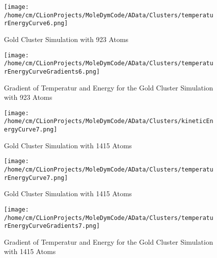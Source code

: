 \begin{figure}[!h] 
    \begin{center} 
        \texttt{[image: /home/cm/CLionProjects/MoleDymCode/AData/Clusters/temperaturEnergyCurve6.png]} 
    \end{center} 
    \caption[Gold Cluster Simulation with 923 Atoms]{Gold Cluster Simulation with 923 Atoms} 
    \label{GoldClusterSimulationTemperaturEnergy923} 
\end{figure} 
 
\begin{figure}[!h] 
    \begin{center} 
        \texttt{[image: /home/cm/CLionProjects/MoleDymCode/AData/Clusters/temperaturEnergyCurveGradients6.png]} 
    \end{center} 
    \caption[Gradient of Temperatur and Energy for the Gold Cluster Simulation with 923 Atoms]{Gradient of Temperatur and Energy for the Gold Cluster Simulation with 923 Atoms} 
    \label{GoldClusterSimulationGradient923} 
\end{figure} 
 
\begin{figure}[!h] 
    \begin{center} 
        \texttt{[image: /home/cm/CLionProjects/MoleDymCode/AData/Clusters/kineticEnergyCurve7.png]} 
    \end{center} 
    \caption[Gold Cluster Simulation with 1415 Atoms]{Gold Cluster Simulation with 1415 Atoms} 
    \label{GoldClusterSimulationKineticTime1415} 
\end{figure} 
 
\begin{figure}[!h] 
    \begin{center} 
        \texttt{[image: /home/cm/CLionProjects/MoleDymCode/AData/Clusters/temperaturEnergyCurve7.png]} 
    \end{center} 
    \caption[Gold Cluster Simulation with 1415 Atoms]{Gold Cluster Simulation with 1415 Atoms} 
    \label{GoldClusterSimulationTemperaturEnergy1415} 
\end{figure} 
 
\begin{figure}[!h] 
    \begin{center} 
        \texttt{[image: /home/cm/CLionProjects/MoleDymCode/AData/Clusters/temperaturEnergyCurveGradients7.png]} 
    \end{center} 
    \caption[Gradient of Temperatur and Energy for the Gold Cluster Simulation with 1415 Atoms]{Gradient of Temperatur and Energy for the Gold Cluster Simulation with 1415 Atoms} 
    \label{GoldClusterSimulationGradient1415} 
\end{figure} 
 
